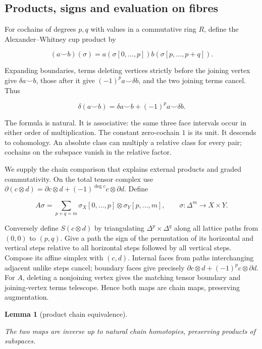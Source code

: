 \documentclass[11pt]{article}
\newtheorem{lemma}[theorem]{Lemma}
\begin{document}
\subsection{Products, signs and evaluation on fibres}
\label{mapsI:chain:section-4}

For cochains of degrees \(p,q\) with values in a commutative ring \(R\), define the Alexander--Whitney cup product by

\[
(a\smile b)(\sigma)=a(\sigma[0,\ldots,p])
b(\sigma[p,\ldots,p+q]).
\]

Expanding boundaries, terms deleting vertices strictly before the joining vertex give \(\delta a\smile b\), those after it give \((-1)^p a\smile\delta b\), and the two joining terms cancel. Thus

\[
\delta(a\smile b)=\delta a\smile b+(-1)^p a\smile\delta b.
\]

The formula is natural. It is associative: the same three face intervals occur in either order of multiplication. The constant zero-cochain \(1\) is its unit. It descends to cohomology. An absolute class can multiply a relative class for every pair; cochains on the subspace vanish in the relative factor.

We supply the chain comparison that explains external products and graded commutativity. On the total tensor complex use
\(\partial(c\otimes d)=\partial c\otimes d+(-1)^{\deg c}c\otimes\partial d\).
Define

\[
A\sigma=\sum_{p+q=m}\sigma_X[0,\ldots,p]\otimes\sigma_Y[p,\ldots,m],
\qquad \sigma:\Delta^m\to X\times Y.
\]

Conversely define \(S(c\otimes d)\) by triangulating \(\Delta^p\times\Delta^q\) along all lattice paths from \((0,0)\) to \((p,q)\). Give a path the sign of the permutation of its horizontal and vertical steps relative to all horizontal steps followed by all vertical steps. Compose its affine simplex with \((c,d)\). Internal faces from paths interchanging adjacent unlike steps cancel; boundary faces give precisely \(\partial c\otimes d+(-1)^p c\otimes\partial d\). For \(A\), deleting a nonjoining vertex gives the matching tensor boundary and joining-vertex terms telescope. Hence both maps are chain maps, preserving augmentation.

\begin{lemma}[product chain equivalence]
\label{mapsI:chain:lemma:4.1}
\leavevmode\par
The two maps are inverse up to natural chain homotopies, preserving products of subspaces.
\end{lemma}
\end{document}
